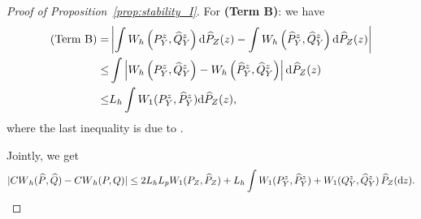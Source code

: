 \documentclass{article}
\theoremstyle{plain}
\theoremstyle{definition}
\def\PP{P}
\def\QQ{Q}
\theoremstyle{plain}
\newcommand{\diff}{{\rm d}}
\newcommand{\Cwass}{{CW}}
\begin{document}
\begin{proof}[Proof of Proposition~\ref{prop:stability_I}]
    For \textbf{(Term B)}: we have
    \[
        \begin{aligned}
            (\text{Term B}) = & \left|\int W_{h}\left(\PP_Y^{z}, \widehat \QQ_Y^{z}\right) \diff \widehat \PP_Z(z) - \int W_{h}\left(\widehat \PP_Y^{z}, \widehat \QQ_Y^{z}\right) \diff \widehat \PP_Z(z) \right|\\
            \leq & \int \left| W_{h}\left(\PP_Y^{z}, \widehat \QQ_Y^{z}\right)  - W_{h}\left(\widehat \PP_Y^{z}, \widehat \QQ_Y^{z}\right) \right| \diff \widehat \PP_Z(z)\\
            \leq & L_h \int W_1(\PP_Y^{z}, \widehat \PP_Y^{z}) \diff \widehat \PP_Z(z),
        \end{aligned}
    \]
    where the last inequality is due to \cite[Lemma 5]{lin2025estimation}.
    
    Jointly, we get
    \[
        |\Cwass_h(\widehat \PP, \widehat \QQ) - \Cwass_h(\PP, \QQ)| \leq 2L_h L_p W_1(\PP_Z, \widehat \PP_Z) + L_h \int W_1(\PP_Y^z, \widehat \PP_Y^z) + W_1(\QQ_Y^z, \widehat \QQ_Y^z) \, \widehat \PP_Z(\diff z).
    \]
    
\end{proof}
\end{document}
